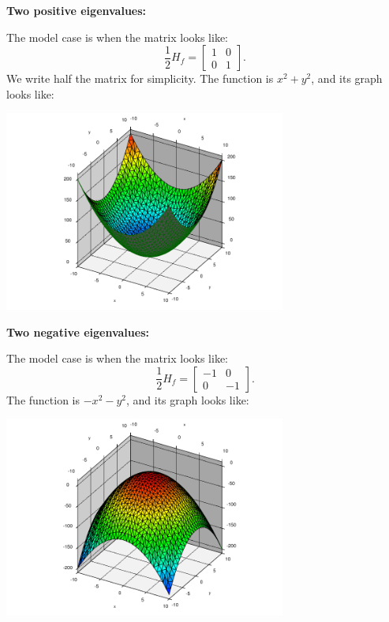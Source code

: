 \documentclass[12pt]{article}
\begin{document}
\bigskip

\textbf{Two positive eigenvalues:}
\nopagebreak

The model case is when the matrix looks like:
\begin{equation*}
\frac{1}{2} H_f
=
\begin{bmatrix}
1 & 0 \\
0 & 1
\end{bmatrix} .
\end{equation*}
We write half the matrix for simplicity.
The function is $x^2+y^2$, and
its graph looks like:
\begin{center}
\includegraphics[width=3.65in]{xsqplusysq}
\end{center}

\bigskip

\pagebreak[3]
\textbf{Two negative eigenvalues:}
\nopagebreak

The model case is when the matrix looks like:
\begin{equation*}
\frac{1}{2} H_f
=
\begin{bmatrix}
-1 & 0 \\
0 & -1
\end{bmatrix} .
\end{equation*}
The function is $-x^2-y^2$, and
its graph looks like:
\begin{center}
\includegraphics[width=3.65in]{minusxsqminusysq}
\end{center}
\end{document}
